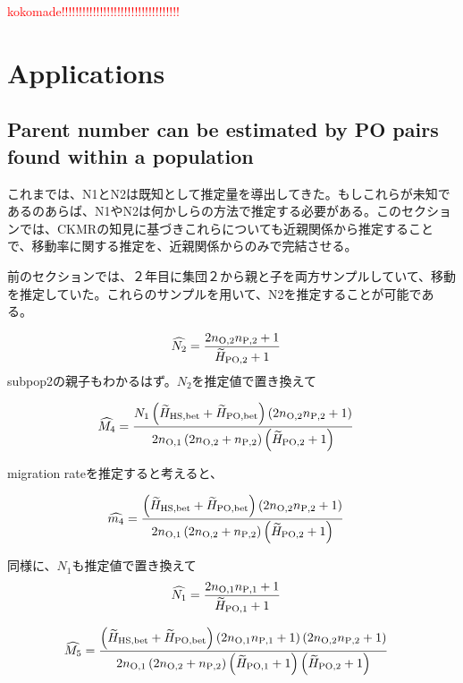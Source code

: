 \documentclass[12pt, English]{article}
\begin{document}
\begin{spacing}{1.9}
\textcolor{red}{kokomade!!!!!!!!!!!!!!!!!!!!!!!!!!!!!!!!!!}
\section{Applications}\label{sec3}


\subsection{Parent number can be estimated by PO pairs found within a population}

これまでは、N1とN2は既知として推定量を導出してきた。もしこれらが未知であるのあらば、N1やN2は何かしらの方法で推定する必要がある。このセクションでは、CKMRの知見に基づきこれらについても近親関係から推定することで、移動率に関する推定を、近親関係からのみで完結させる。

前のセクションでは、２年目に集団２から親と子を両方サンプルしていて、移動を推定していた。これらのサンプルを用いて、N2を推定することが可能である。

\begin{align}
\widehat{N_2} &= \frac{ 2 n_{\rm O, 2} n_{\rm P, 2} + 1 }{\widetilde{H}_{\rm PO, 2} + 1} 
\label{AP-3}
\end{align}
subpop2の親子もわかるはず。$N_2$を推定値で置き換えて

\begin{align}
\widehat{M_4} &=  \frac{ N_{1} \left(\widetilde{H}_{\rm HS,bet} + \widetilde{H}_{\rm PO,bet}\right) \left(2 n_{\rm O, 2} n_{\rm P, 2} + 1\right)} {2n_{\rm O, 1} \left(2 n_{\rm O, 2} + n_{\rm P, 2}\right) \left(\widetilde{H}_{\rm PO, 2} + 1\right)}
\label{AP-4}
\end{align}

migration rateを推定すると考えると、

\begin{align}
\widehat{m_4} &=  \frac{ \left(\widetilde{H}_{\rm HS,bet} + \widetilde{H}_{\rm PO,bet}\right) \left(2 n_{\rm O, 2} n_{\rm P, 2} + 1\right)} {2n_{\rm O, 1} \left(2 n_{\rm O, 2} + n_{\rm P, 2}\right) \left(\widetilde{H}_{\rm PO, 2} + 1\right)}
\label{AP-5}
\end{align}

同様に、$N_1$も推定値で置き換えて
\begin{align}
\widehat{N_1} &= \frac{ 2 n_{\rm O, 1} n_{\rm P, 1} + 1 }{\widetilde{H}_{\rm PO, 1} + 1} 
\label{AP-6}
\end{align}

\begin{align}
\widehat{M_5} &=  \frac{ \left(\widetilde{H}_{\rm HS,bet} + \widetilde{H}_{\rm PO,bet}\right) \left(2 n_{\rm O, 1} n_{\rm P, 1} + 1\right) \left(2 n_{\rm O, 2} n_{\rm P, 2} + 1\right)} {2n_{\rm O, 1} \left(2 n_{\rm O, 2} + n_{\rm P, 2}\right) \left(\widetilde{H}_{\rm PO, 1} + 1\right) \left(\widetilde{H}_{\rm PO, 2} + 1\right)}
\label{AP-7}
\end{align}


\end{spacing}
\end{document}
